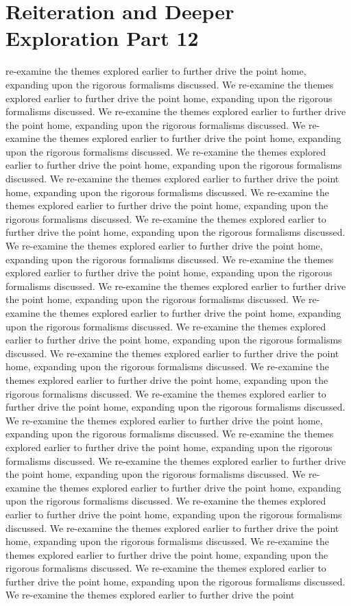 \section{Reiteration and Deeper Exploration Part 12}\nWe re-examine the themes explored earlier to further drive the point home, expanding upon the rigorous formalisms discussed. We re-examine the themes explored earlier to further drive the point home, expanding upon the rigorous formalisms discussed. We re-examine the themes explored earlier to further drive the point home, expanding upon the rigorous formalisms discussed. We re-examine the themes explored earlier to further drive the point home, expanding upon the rigorous formalisms discussed. We re-examine the themes explored earlier to further drive the point home, expanding upon the rigorous formalisms discussed. We re-examine the themes explored earlier to further drive the point home, expanding upon the rigorous formalisms discussed. We re-examine the themes explored earlier to further drive the point home, expanding upon the rigorous formalisms discussed. We re-examine the themes explored earlier to further drive the point home, expanding upon the rigorous formalisms discussed. We re-examine the themes explored earlier to further drive the point home, expanding upon the rigorous formalisms discussed. We re-examine the themes explored earlier to further drive the point home, expanding upon the rigorous formalisms discussed. We re-examine the themes explored earlier to further drive the point home, expanding upon the rigorous formalisms discussed. We re-examine the themes explored earlier to further drive the point home, expanding upon the rigorous formalisms discussed. We re-examine the themes explored earlier to further drive the point home, expanding upon the rigorous formalisms discussed. We re-examine the themes explored earlier to further drive the point home, expanding upon the rigorous formalisms discussed. We re-examine the themes explored earlier to further drive the point home, expanding upon the rigorous formalisms discussed. We re-examine the themes explored earlier to further drive the point home, expanding upon the rigorous formalisms discussed. We re-examine the themes explored earlier to further drive the point home, expanding upon the rigorous formalisms discussed. We re-examine the themes explored earlier to further drive the point home, expanding upon the rigorous formalisms discussed. We re-examine the themes explored earlier to further drive the point home, expanding upon the rigorous formalisms discussed. We re-examine the themes explored earlier to further drive the point home, expanding upon the rigorous formalisms discussed. We re-examine the themes explored earlier to further drive the point home, expanding upon the rigorous formalisms discussed. We re-examine the themes explored earlier to further drive the point home, expanding upon the rigorous formalisms discussed. We re-examine the themes explored earlier to further drive the point home, expanding upon the rigorous formalisms discussed. We re-examine the themes explored earlier to further drive the point home, expanding upon the rigorous formalisms discussed. We re-examine the themes explored earlier to further drive the point 